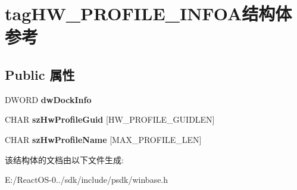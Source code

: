 \hypertarget{structtag_h_w___p_r_o_f_i_l_e___i_n_f_o_a}{}\section{tag\+H\+W\+\_\+\+P\+R\+O\+F\+I\+L\+E\+\_\+\+I\+N\+F\+O\+A结构体 参考}
\label{structtag_h_w___p_r_o_f_i_l_e___i_n_f_o_a}
\subsection*{Public 属性}
\begin{DoxyCompactItemize}
\item 
\mbox{\label{structtag_h_w___p_r_o_f_i_l_e___i_n_f_o_a_af29251ae98d7e21df1775e426773cd0e}} 
D\+W\+O\+RD {\bfseries dw\+Dock\+Info}
\item 
\mbox{\label{structtag_h_w___p_r_o_f_i_l_e___i_n_f_o_a_a2065df75d87e2ded080bebdcd8a78ae5}} 
C\+H\+AR {\bfseries sz\+Hw\+Profile\+Guid} \mbox{[}H\+W\+\_\+\+P\+R\+O\+F\+I\+L\+E\+\_\+\+G\+U\+I\+D\+L\+EN\mbox{]}
\item 
\mbox{\label{structtag_h_w___p_r_o_f_i_l_e___i_n_f_o_a_a4bd25993ce549ecea73b4e46990dbeb6}} 
C\+H\+AR {\bfseries sz\+Hw\+Profile\+Name} \mbox{[}M\+A\+X\+\_\+\+P\+R\+O\+F\+I\+L\+E\+\_\+\+L\+EN\mbox{]}
\end{DoxyCompactItemize}


该结构体的文档由以下文件生成\+:\begin{DoxyCompactItemize}
\item 
E\+:/\+React\+O\+S-\/0../sdk/include/psdk/winbase.\+h\end{DoxyCompactItemize}
